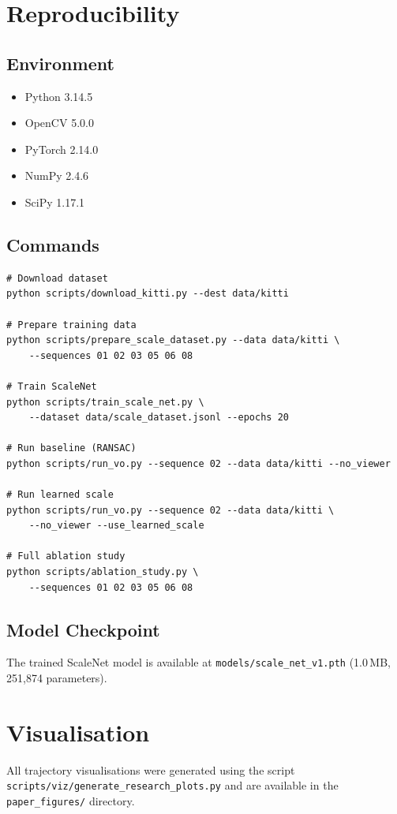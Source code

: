 \documentclass[12pt,a4paper]{article}
\begin{document}
\appendix
\section{Reproducibility}

\subsection{Environment}
\begin{itemize}
    \item Python 3.14.5
    \item OpenCV 5.0.0
    \item PyTorch 2.14.0
    \item NumPy 2.4.6
    \item SciPy 1.17.1
\end{itemize}

\subsection{Commands}
\begin{verbatim}
# Download dataset
python scripts/download_kitti.py --dest data/kitti

# Prepare training data
python scripts/prepare_scale_dataset.py --data data/kitti \
    --sequences 01 02 03 05 06 08

# Train ScaleNet
python scripts/train_scale_net.py \
    --dataset data/scale_dataset.jsonl --epochs 20

# Run baseline (RANSAC)
python scripts/run_vo.py --sequence 02 --data data/kitti --no_viewer

# Run learned scale
python scripts/run_vo.py --sequence 02 --data data/kitti \
    --no_viewer --use_learned_scale

# Full ablation study
python scripts/ablation_study.py \
    --sequences 01 02 03 05 06 08
\end{verbatim}

\subsection{Model Checkpoint}
The trained ScaleNet model is available at
\texttt{models/scale\_net\_v1.pth} (1.0\,MB, 251,874 parameters).

\section{Visualisation}
All trajectory visualisations were generated using the script
\texttt{scripts/viz/generate\_research\_plots.py} and are available
in the \texttt{paper\_figures/} directory.
\end{document}
